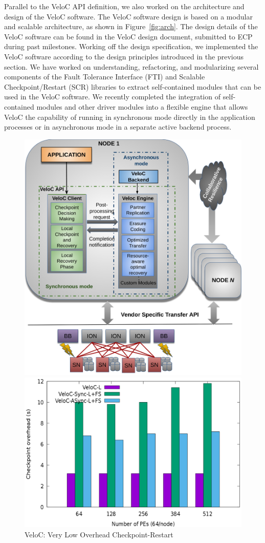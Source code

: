 Parallel to the VeloC API definition, we also worked on the
architecture and design of the VeloC software. The VeloC software
design is based on a modular and scalable architecture, as shown in
Figure~\ref{fig:arch}. The design details of the VeloC software
can be found in the VeloC design document, submitted to ECP during
past milestones. Working off the design specification, we implemented
the VeloC software according to the design principles introduced in
the previous section. We have worked on understanding, refactoring,
and modularizing several components of the Fault Tolerance Interface
(FTI) and Scalable Checkpoint/Restart (SCR) libraries to extract
self-contained modules that can be used in the VeloC software. We
recently completed the integration of self-contained modules and
other driver modules into a flexible engine that allows VeloC the
capability of running in synchronous mode directly in the application
processes or in asynchronous mode in a separate active backend
process.

\begin{figure}[t]
\centering
  \begin{subfloat}
  	\centering
      \includegraphics[width=.47\textwidth]{projects/2.3.4-DataViz/2.3.4.05-VeloC/veloc-arch}
\end{subfloat}
  \hfill
  \begin{subfloat}
  	\centering
    \includegraphics[width=.47\textwidth]{projects/2.3.4-DataViz/2.3.4.05-VeloC/veloc-res}
\end{subfloat}
  \caption{VeloC: Very Low Overhead Checkpoint-Restart}%
  \label{fig:veloc}%
\end{figure}


